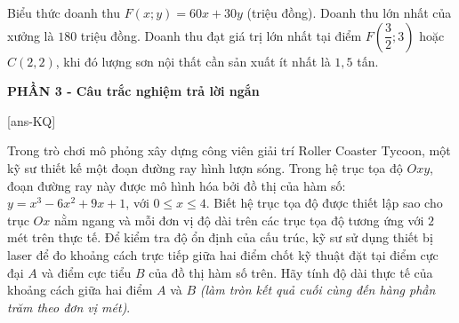 \begin{ex}
{\begin{itemchoice}
{
			}
			\itemch Biểu thức doanh thu $F(x;y)=60x+30y$ (triệu đồng).
			\itemch Doanh thu lớn nhất của xưởng là $180$ triệu đồng.
			\itemch Doanh thu đạt giá trị lớn nhất tại điểm $F\left(\dfrac{3}{2};3\right)$ hoặc $C(2,2)$, khi đó lượng sơn nội thất cần sản xuất ít nhất là $1{,}5$ tấn. 
		\end{itemchoice}
		
	}
\end{ex}




\begin{center}
	\textbf{PHẦN 3 - Câu trắc nghiệm trả lời ngắn}
\end{center}
\setcounter{ex}{0}

[ans-KQ]
\begin{ex}%
	Trong trò chơi mô phỏng xây dựng công viên giải trí Roller Coaster Tycoon, một kỹ sư thiết kế một đoạn đường ray hình lượn sóng. Trong hệ trục tọa độ $Oxy$, đoạn đường ray này được mô hình hóa bởi đồ thị của hàm số: $y = x^3 - 6x^2 + 9x + 1$, với $0 \le x \le 4$. Biết hệ trục tọa độ được thiết lập sao cho trục $Ox$ nằm ngang và mỗi đơn vị độ dài trên các trục tọa độ tương ứng với $2$ mét trên thực tế. Để kiểm tra độ ổn định của cấu trúc, kỹ sư sử dụng thiết bị laser để đo khoảng cách trực tiếp giữa hai điểm chốt kỹ thuật đặt tại điểm cực đại $A$ và điểm cực tiểu $B$ của đồ thị hàm số trên. Hãy tính độ dài thực tế của khoảng cách giữa hai điểm $A$ và $B$ \textit{(làm tròn kết quả cuối cùng đến hàng phần trăm theo đơn vị mét)}.
\end{ex}

